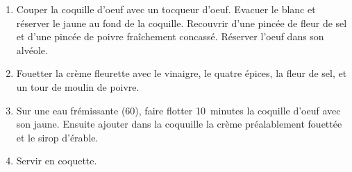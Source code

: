 
\begin{ingredients}
\end{ingredients}


\begin{recipe}
  \begin{enumerate}

  \item Couper la coquille d'oeuf avec un tocqueur d'oeuf.  Evacuer le
    blanc et r\'eserver le jaune au fond de la coquille.  Recouvrir
    d'une pinc\'ee de fleur de sel et d'une pinc\'ee de poivre
    fra\^ichement concass\'e.  R\'eserver l'oeuf dans son alv\'eole.

  \item Fouetter la cr\`eme fleurette avec le vinaigre, le quatre
    \'epices, la fleur de sel, et un tour de moulin de poivre.

  \item Sur une eau fr\'emissante (60\C), faire flotter 10~minutes la
    coquille d'oeuf avec son jaune.  Ensuite ajouter dans la coquuille
    la cr\`eme pr\'ealablement fouett\'ee et le sirop d'\'erable.

  \item Servir en coquette.

  \end{enumerate}
\end{recipe}
